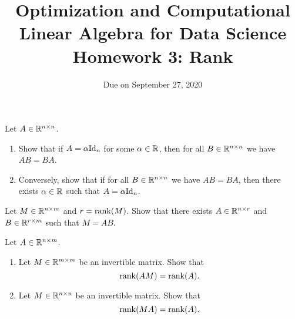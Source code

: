 \documentclass[11pt,nocut]{article}
\title{\vspace{-2.0cm}%
	Optimization and Computational Linear Algebra for Data Science\\
Homework 3: Rank}
\date{\vspace{-1cm}Due on September 27, 2020}
\begin{document}
\maketitle



\begin{problem}[2 points]
	Let $A \in \mathbb{R}^{n \times n}$.
	\begin{enumerate}[label=\normalfont(\textbf{\alph*})]
		\item Show that if $A = \alpha {{\rm Id}}_n$ for some $\alpha \in \mathbb{R}$, then for all $B \in \mathbb{R}^{n \times n}$ we have $A B = B A$.
		\item Conversely, show that if for all $B \in \mathbb{R}^{n \times n}$ we have $AB = BA$, then there exists $\alpha \in \mathbb{R}$ such that $A = \alpha {{\rm Id}}_n$.
	\end{enumerate}
\end{problem}

\vspace{1mm}

\begin{problem}[3 points]
	Let $M \in \mathbb{R}^{n \times m}$ and $r = {{\rm rank}}(M)$. Show that there exists $A \in \mathbb{R}^{n \times r}$ and $B \in \mathbb{R}^{r \times m}$ such that $M = AB$.
\end{problem}

\vspace{1mm}

\begin{problem}[3 points]
	Let $A \in \mathbb{R}^{n \times m}$. 
	\begin{enumerate}[label=\normalfont(\textbf{\alph*})]
		\item Let $M \in \mathbb{R}^{m \times m}$ be an invertible matrix.
			Show that
			$$
			{{\rm rank}}(AM) = {{\rm rank}}(A).
			$$
		\item Let $M \in \mathbb{R}^{n \times n}$ be an invertible matrix.
			Show that
			$$
			{{\rm rank}}(MA) = {{\rm rank}}(A).
			$$
	\end{enumerate}
\end{problem}

\vspace{1mm}

\end{document}
